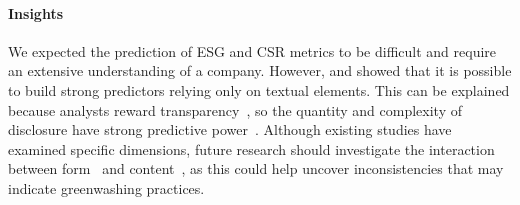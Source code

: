 \paragraph{Insights} We expected the prediction of ESG and CSR metrics to be difficult and require an extensive understanding of a company. However, \citet{bronzini_glitter_2023, linSUSTAINABLESIGNALSijcai2023, Mehra_2022} and \citet{clarkson_nlp_us_csr} showed that it is possible to build strong predictors relying only on textual elements. This can be explained because analysts reward transparency~\cite{bronzini_glitter_2023}, so the quantity and complexity of disclosure have strong predictive power~\cite{clarkson_nlp_us_csr}. Although existing studies have examined specific dimensions, future research should investigate the interaction between form~\cite{clarkson_nlp_us_csr} and content~\cite{bronzini_glitter_2023}, as this could help uncover inconsistencies that may indicate greenwashing practices.

